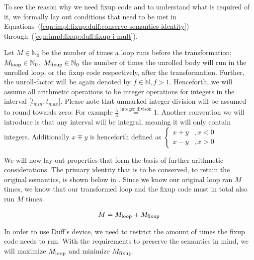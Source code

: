 To see the reason why we need fixup code and to understand what is required of it, we formally lay out conditions that need to be met in Equations~(\ref{eqn:impl:fixup:duff:conserve-semantics-identity}) through~(\ref{eqn:impl:fixup:duff:fixup-i-mult}).

Let $M \in \mathbb{N}_0$ be the number of times a loop runs before the transformation; $M_{\text{loop}} \in \mathbb{N}_0$, $M_{\text{fixup}} \in \mathbb{N}_0$ the number of times the unrolled body will run in the unrolled loop, or the fixup code respectively, after the transformation.
Further, the unroll-factor will be again denoted by $f \in \mathbb{N}, f > 1$.
Henceforth, we will assume all arithmetic operations to be integer operations for integers in the interval $\lbrack t_{min}, t_{max} \rbrack$.
Please note that unmarked integer division will be assumed to round towards zero: For example $\frac{5}{3} \overset{\text{integer divison}}{=} 1$.
Another convention we will introduce is that any interval will be integral, meaning it will only contain integers.
Additionally $x \mp y$ is henceforth defined as
$\begin{cases}
     x + y &, x < 0\\
     x - y &, x > 0
\end{cases}$

We will now lay out properties that form the basis of further arithmetic considerations.
The primary identity that is to be conserved, to retain the original semantics, is shown below in .
Since we know our original loop ran $M$ times, we know that our transformed loop and the fixup code must in total also run $M$ times.

\begin{equation}\label{eqn:impl:fixup:duff:conserve-semantics-identity}
\begin{aligned}
    M = M_{\text{loop}} + M_{\text{fixup}}
\end{aligned}
\end{equation}

In order to use Duff's device, we need to restrict the amount of times the fixup code needs to run.
With the requirements to preserve the semantics in mind, we will maximize $M_{\text{loop}}$ and minimize $M_{\text{fixup}}$.

